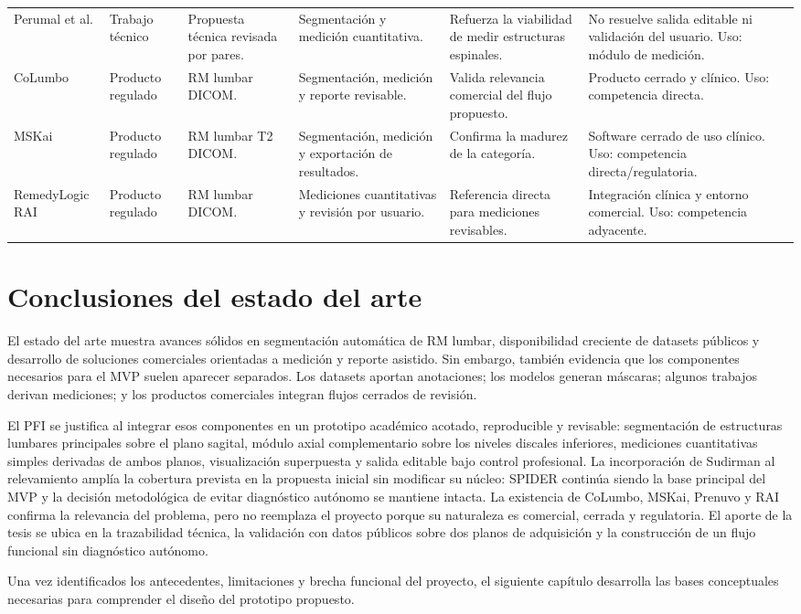 \begin{table}[p]
\begin{tabularx}{\textwidth}{p{} p{} p{} p{} p{} p{}}
Perumal et al. \parencite{perumal_thecal_sac_2026} & Trabajo técnico & Propuesta técnica revisada por pares. & Segmentación y medición cuantitativa. & Refuerza la viabilidad de medir estructuras espinales. & No resuelve salida editable ni validación del usuario. Uso: módulo de medición. \\
CoLumbo \parencite{fda_columbo_2022} & Producto regulado & RM lumbar DICOM. & Segmentación, medición y reporte revisable. & Valida relevancia comercial del flujo propuesto. & Producto cerrado y clínico. Uso: competencia directa. \\
MSKai \parencite{fda_mskai_2024} & Producto regulado & RM lumbar T2 DICOM. & Segmentación, medición y exportación de resultados. & Confirma la madurez de la categoría. & Software cerrado de uso clínico. Uso: competencia directa/regulatoria. \\
RemedyLogic RAI \parencite{fda_remedylogic_2024} & Producto regulado & RM lumbar DICOM. & Mediciones cuantitativas y revisión por usuario. & Referencia directa para mediciones revisables. & Integración clínica y entorno comercial. Uso: competencia adyacente. \\
\hline
\end{tabularx}
\end{table}

\section{Conclusiones del estado del arte}

El estado del arte muestra avances sólidos en segmentación automática de RM lumbar, disponibilidad creciente de datasets públicos y desarrollo de soluciones comerciales orientadas a medición y reporte asistido. Sin embargo, también evidencia que los componentes necesarios para el MVP suelen aparecer separados. Los datasets aportan anotaciones; los modelos generan máscaras; algunos trabajos derivan mediciones; y los productos comerciales integran flujos cerrados de revisión.

El PFI se justifica al integrar esos componentes en un prototipo académico acotado, reproducible y revisable: segmentación de estructuras lumbares principales sobre el plano sagital, módulo axial complementario sobre los niveles discales inferiores, mediciones cuantitativas simples derivadas de ambos planos, visualización superpuesta y salida editable bajo control profesional. La incorporación de Sudirman al relevamiento amplía la cobertura prevista en la propuesta inicial sin modificar su núcleo: SPIDER continúa siendo la base principal del MVP y la decisión metodológica de evitar diagnóstico autónomo se mantiene intacta. La existencia de CoLumbo, MSKai, Prenuvo y RAI confirma la relevancia del problema, pero no reemplaza el proyecto porque su naturaleza es comercial, cerrada y regulatoria. El aporte de la tesis se ubica en la trazabilidad técnica, la validación con datos públicos sobre dos planos de adquisición y la construcción de un flujo funcional sin diagnóstico autónomo.

Una vez identificados los antecedentes, limitaciones y brecha funcional del proyecto, el siguiente capítulo desarrolla las bases conceptuales necesarias para comprender el diseño del prototipo propuesto.
